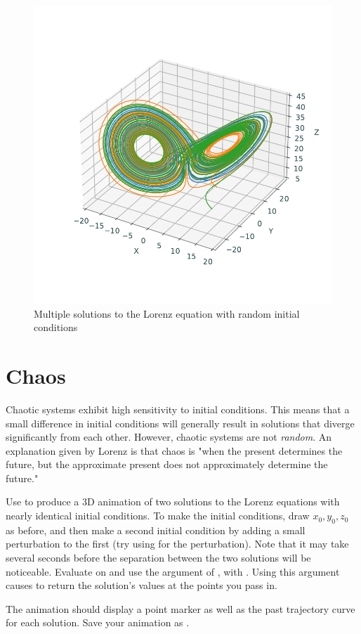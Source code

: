 \begin{figure}
\includegraphics[width=\textwidth]{figures/Multiple_Lorenz.pdf}
\caption{Multiple solutions to the Lorenz equation with random initial conditions}
\label{fig:Multiple_Lorenz}
\end{figure}

\section*{Chaos}
Chaotic systems exhibit high sensitivity to initial conditions. 
This means that a small difference in initial conditions will generally result in solutions that diverge significantly from each other. 
However, chaotic systems are not \textit{random}. 
An explanation given by Lorenz is that chaos is "when the present determines the future, but the approximate present does not approximately determine the future."

\begin{problem}
\label{lorenz:prob:chaos}
Use  to produce a 3D animation of two solutions to the Lorenz equations with nearly identical initial conditions. To make the initial conditions, draw $x_0,y_0,z_0$ as before, and then make a second initial condition by adding a small perturbation to the first (try using  for the perturbation). Note that it may take several seconds before the separation between the two solutions will be noticeable. Evaluate on  and use the  argument of , with . Using this argument causes  to return the solution's values at the points you pass in.

The animation should display a point marker as well as the past trajectory curve for each solution. 
Save your animation as .
\end{problem}

